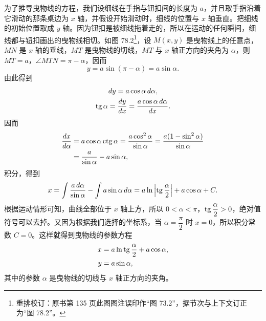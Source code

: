 为了推导曳物线的方程，我们设细线在手指与钮扣间的长度为 $a$，并且取手指沿着它滑动的那条桌边为 $x$ 轴，并假设开始滑动时，细线的位置与 $x$ 轴垂直。把细线的初始位置取成 $y$ 轴。因为钮扣是被细线拖着走的，所以在运动的任何瞬间，细线都与钮扣画出的曳物线相切。如图 78.2\footnote{重排校订：原书第 135 页此图图注误印作“图 73.2”，据节次与上下文订正为“图 78.2”。}，设 $M(x,y)$ 是曳物线上的任意点，$MN$ 是 $x$ 轴的垂线，$MT$ 是曳物线的切线，$MT$ 与 $x$ 轴正方向的夹角为 $\alpha$，则 $MT=a$，$\angle MTN=\pi-\alpha$，因而
\[
  y = a\sin(\pi-\alpha) = a\sin\alpha.
\]
由此得到
\begin{gather*}
  dy = a\cos\alpha\,d\alpha, \\
  \operatorname{tg}\alpha = \frac{dy}{dx} = \frac{a\cos\alpha\,d\alpha}{dx}.
\end{gather*}
因而
\begin{align*}
  \frac{dx}{d\alpha} &= a\cos\alpha\operatorname{ctg}\alpha = \frac{a\cos^2\alpha}{\sin\alpha} = \frac{a(1-\sin^2\alpha)}{\sin\alpha} \\
                     &= \frac{a}{\sin\alpha} - a\sin\alpha,
\end{align*}
积分，得到
\[
  x = \int\frac{a\,d\alpha}{\sin\alpha} - \int a\sin\alpha\,d\alpha = a\ln\left|\operatorname{tg}\frac{\alpha}{2}\right| + a\cos\alpha + C.
\]
根据运动情形可知，曲线全部位于 $x$ 轴上方，所以 $0<\alpha<\pi$，$\operatorname{tg}\dfrac{\alpha}{2}>0$，绝对值符号可以去掉。又因为根据我们选择的坐标系，当 $\alpha=\dfrac{\pi}{2}$ 时 $x=0$，所以积分常数 $C=0$。这样就得到曳物线的参数方程
\begin{align*}
  x &= a\ln\operatorname{tg}\frac{\alpha}{2} + a\cos\alpha, \\
  y &= a\sin\alpha,
\end{align*}
其中的参数 $\alpha$ 是曳物线的切线与 $x$ 轴正方向的夹角。

